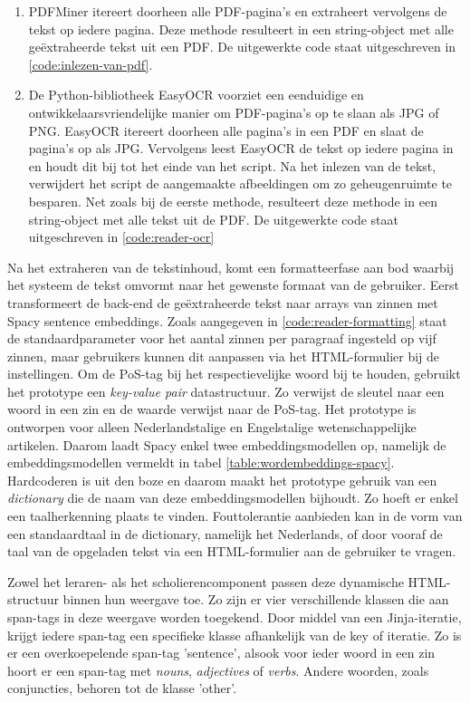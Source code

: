 \begin{enumerate}
	\item PDFMiner itereert doorheen alle PDF-pagina's en extraheert vervolgens de tekst op iedere pagina. Deze methode resulteert in een string-object met alle geëxtraheerde tekst uit een PDF. De uitgewerkte code staat uitgeschreven in \ref{code:inlezen-van-pdf}.
	\item De Python-bibliotheek EasyOCR voorziet een eenduidige en ontwikkelaarsvriendelijke manier om PDF-pagina's op te slaan als JPG of PNG. EasyOCR itereert doorheen alle pagina's in een PDF en slaat de pagina's op als JPG. Vervolgens leest EasyOCR de tekst op iedere pagina in en houdt dit bij tot het einde van het script. Na het inlezen van de tekst, verwijdert het script de aangemaakte afbeeldingen om zo geheugenruimte te besparen. Net zoals bij de eerste methode, resulteert deze methode in een string-object met alle tekst uit de PDF. De uitgewerkte code staat uitgeschreven in \ref{code:reader-ocr}
\end{enumerate}

Na het extraheren van de tekstinhoud, komt een formatteerfase aan bod waarbij het systeem de tekst omvormt naar het gewenste formaat van de gebruiker. Eerst transformeert de back-end de geëxtraheerde tekst naar arrays van zinnen met Spacy sentence embeddings. Zoals aangegeven in \ref{code:reader-formatting} staat de standaardparameter voor het aantal zinnen per paragraaf ingesteld op vijf zinnen, maar gebruikers kunnen dit aanpassen via het HTML-formulier bij de instellingen. Om de PoS-tag bij het respectievelijke woord bij te houden, gebruikt het prototype een \textit{key-value pair} datastructuur. Zo verwijst de sleutel naar een woord in een zin en de waarde verwijst naar de PoS-tag. Het prototype is ontworpen voor alleen Nederlandstalige en Engelstalige wetenschappelijke artikelen. Daarom laadt Spacy enkel twee embeddingsmodellen op, namelijk de embeddingsmodellen vermeldt in tabel \ref{table:wordembeddings-spacy}. Hardcoderen is uit den boze en daarom maakt het prototype gebruik van een \textit{dictionary} die de naam van deze embeddingsmodellen bijhoudt. Zo hoeft er enkel een taalherkenning plaats te vinden. Fouttolerantie aanbieden kan in de vorm van een standaardtaal in de dictionary, namelijk het Nederlands, of door vooraf de taal van de opgeladen tekst via een HTML-formulier aan de gebruiker te vragen.

\medspace

Zowel het leraren- als het scholierencomponent passen deze dynamische HTML-structuur binnen hun weergave toe. Zo zijn er vier verschillende klassen die aan span-tags in deze weergave worden toegekend. Door middel van een Jinja-iteratie, krijgt iedere span-tag een specifieke klasse afhankelijk van de key of iteratie. Zo is er een overkoepelende span-tag 'sentence', alsook voor ieder woord in een zin hoort er een span-tag met \textit{nouns}, \textit{adjectives} of \textit{verbs}. Andere woorden, zoals conjuncties, behoren tot de klasse 'other'.

